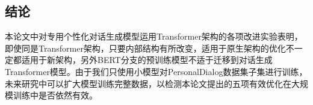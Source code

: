 \documentclass[letterpaper]{article} %
\begin{document}
\begin{CJK*}{UTF8}{gbsn}
\section[Conclusion]{结论} 
本论文中对专用个性化对话生成模型运用Transformer架构的各项改进实验表明，即使同是Transformer架构，只要内部结构有所改变，适用于原生架构的优化不一定都适用于新架构，另外BERT分支的预训练模型不适于迁移到对话生成Transformer模型。由于我们只使用小模型对PersonalDialog数据集子集进行训练，未来研究中可以扩大模型训练完整数据，以检测本论文提出的五项有效优化在大规模训练中是否依然有效。




\clearpage\end{CJK*}
\end{document}
